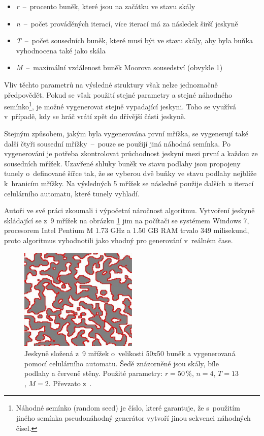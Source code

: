\begin{itemize}
\item \textit{r}~--~procento buněk, které jsou na začátku ve stavu skály
\item \textit{n}~--~počet prováděných iterací, více iterací má za následek širší jeskyně
\item \textit{T}~--~počet sousedních buněk, které musí být ve stavu skály, aby byla buňka vyhodnocena také jako skála
\item \textit{M}~--~maximální vzdálenost buněk Moorova sousedství (obvykle 1)
\end{itemize}
Vliv těchto parametrů na výsledné struktury však nelze jednoznačně předpovědět.
Pokud se však použití stejné parametry a stejné náhodného semínko\footnote{Náhodné semínko (random seed) je číslo, které garantuje, že s~použitím jiného semínka pseudonáhodný generátor vytvoří jinou sekvenci náhodných čísel.}, je možné vygenerovat stejně vypadající jeskyni.
Toho se využívá v~případě, kdy se hráč vrátí zpět do dřívější části jeskyně.
\par
Stejným způsobem, jakým byla vygenerována první mřížka, se vygenerují také další čtyři sousední mřížky~--~pouze se použijí jiná náhodná semínka.
Po vygenerování je potřeba zkontrolovat průchodnost jeskyní mezi první a každou ze sousedních mřížek.
Uzavřené shluky buněk ve stavu podlahy jsou propojeny tunely o~definované šířce tak, že se vyberou dvě buňky ve stavu podlahy nejblíže k~hranicím mřížky.
Na výsledných 5 mřížek se následně použije dalších \textit{n} iterací celulárního automatu, které tunely vyhladí.
\par
Autoři ve své práci zkoumali i výpočetní náročnost algoritmu.
Vytvoření jeskyně skládající se z~9 mřížek na obrázku \ref{img:cellular_cave} jim na počítači se systémem Windows 7, procesorem Intel Pentium M 1.73 GHz a 1.50 GB RAM trvalo 349 milisekund, proto algoritmus vyhodnotili jako vhodný pro generování v~reálném čase.
\begin{figure}[hbt]
    \centering
    \includegraphics[width=0.5\textwidth]{obrazky/cellular_cave.png}
    \caption{Jeskyně složená z~9 mřížek o~velikosti 50x50 buněk a vygenerovaná pomocí celulárního automatu. Šedě znázorněné jsou skály, bíle podlahy a červeně stěny. Použité parametry: $r=50\,\%$, $n=4$, $T=13$, $M=2$. Převzato z~\cite{lit:cellular_cave}.}
    \label{img:cellular_cave}
\end{figure}
